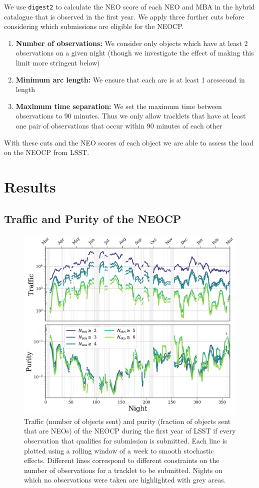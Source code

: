 \documentclass[twocolumn, twocolappendix]{aastex631}
\newcommand{\dig}{\texttt{digest2}}
\begin{document}
We use \dig{} to calculate the NEO score of each NEO and MBA in the hybrid catalogue that is observed in the first year. We apply three further cuts before considering which submissions are eligible for the NEOCP.
\begin{enumerate}
    \item \textbf{Number of observations:} We consider only objects which have at least 2 observations on a given night (though we investigate the effect of making this limit more stringent below)
    \item \textbf{Minimum arc length:} We ensure that each arc is at least 1 arcsecond in length
    \item \textbf{Maximum time separation:} We set the maximum time between observations to 90 minutes. Thus we only allow tracklets that have at least one pair of observations that occur within 90 minutes of each other
\end{enumerate}
With these cuts and the NEO scores of each object we are able to assess the load on the NEOCP from LSST.

\section{Results} \label{sec:results}
\subsection{Traffic and Purity of the NEOCP}
\begin{figure}
    \centering
    \includegraphics[width=\textwidth]{traffic_purity.png}
    \caption{Traffic (number of objects sent) and purity (fraction of objects sent that are NEOs) of the NEOCP during the first year of LSST if every observation that qualifies for submission is submitted. Each line is plotted using a rolling window of a week to smooth stochastic effects. Different lines correspond to different constraints on the number of observations for a tracklet to be submitted. Nights on which no observations were taken are highlighted with grey areas.}
    \label{fig:neocp_traffic}
\end{figure}
\end{document}
